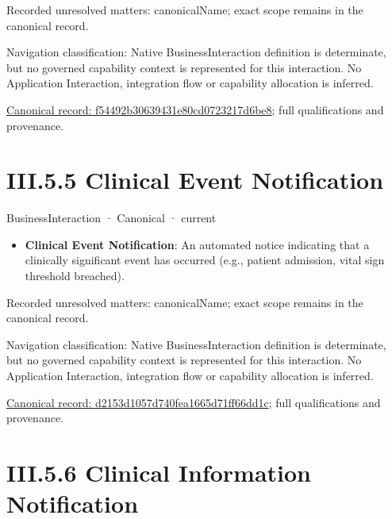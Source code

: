 {\small Recorded unresolved matters: canonicalName; exact scope remains in the canonical record.}\par
{\small Navigation classification: Native BusinessInteraction definition is determinate, but no governed capability context is represented for this interaction. No Application Interaction, integration flow or capability allocation is inferred.}\par
{\footnotesize \href{../../../../../../../../continuum/business/business-interaction/f54492b30639431e80cd0723217d6be8.md}{Canonical record: f54492b30639431e80cd0723217d6be8}; full qualifications and provenance.}\par
\section*{III.5.5 Clinical Event Notification}
\label{navigation:III.5.5}

\label{element:d2153d1057d740fea1665d71ff66dd1c}
{\small BusinessInteraction · Canonical · current}\par

\begin{itemize}


\item \textbf{Clinical Event Notification}: An automated notice indicating that a clinically significant event has occurred (e.g., patient admission, vital sign threshold breached).

\end{itemize}

{\small Recorded unresolved matters: canonicalName; exact scope remains in the canonical record.}\par
{\small Navigation classification: Native BusinessInteraction definition is determinate, but no governed capability context is represented for this interaction. No Application Interaction, integration flow or capability allocation is inferred.}\par
{\footnotesize \href{../../../../../../../../continuum/business/business-interaction/d2153d1057d740fea1665d71ff66dd1c.md}{Canonical record: d2153d1057d740fea1665d71ff66dd1c}; full qualifications and provenance.}\par
\section*{III.5.6 Clinical Information Notification}
\label{navigation:III.5.6}

